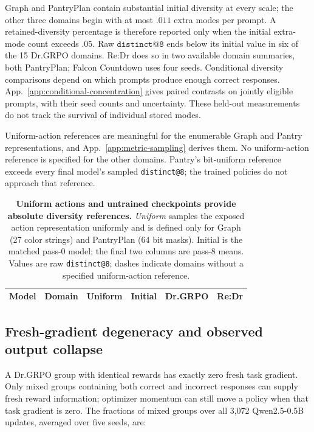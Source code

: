 \documentclass{article}
\makeatletter
\newcommand{\1}{\mathbf 1}
\newcommand{\distk}{\texttt{distinct@8}}
\theoremstyle{remark}
\theoremstyle{definition}
\theoremstyle{plain}
\makeatother
\begin{document}
Graph and PantryPlan contain substantial initial diversity at every scale;
the other three domains begin with at most $.011$ extra modes per prompt.
A retained-diversity percentage is therefore reported only when the initial
extra-mode count exceeds $.05$. Raw $\texttt{distinct@8}$ ends below its
initial value in six of the 15 Dr.GRPO domains. Re:Dr does so in
two available domain summaries, both PantryPlan; Falcon Countdown uses
four seeds. Conditional diversity comparisons depend on which prompts produce
enough correct responses. App.~\ref{app:conditional-concentration} gives
paired contrasts on jointly eligible prompts, with their seed counts and
uncertainty. These held-out measurements do not track the survival of
individual stored modes.

Uniform-action references are meaningful for the enumerable Graph and
Pantry representations, and App.~\ref{app:metric-sampling} derives them. No uniform-action
reference is specified for the other domains. Pantry's bit-uniform reference exceeds every final model's sampled
\texttt{distinct@8}; the trained policies do not approach that reference.

\begin{table}[t]
  \centering
  \caption{\textbf{Uniform actions and untrained checkpoints provide absolute diversity references.}
  \emph{Uniform} samples the exposed action representation uniformly and is
  defined only for Graph (27 color strings) and PantryPlan (64 bit masks).
  Initial is the matched pass-0 model; the final two columns are pass-8 means.
  Values are raw \distk{}; dashes indicate domains without a specified
  uniform-action reference.}
  \label{tab:absolute-support-references}
  \scriptsize
  \setlength{\tabcolsep}{4.2pt}
  \begin{tabular}{@{}llrrrr@{}}
    \toprule
    \textbf{Model} & \textbf{Domain} & \textbf{Uniform} & \textbf{Initial}
      & \textbf{Dr.GRPO} & \textbf{Re:Dr} \\
    \midrule
    
  \end{tabular}
\end{table}


\subsection{Fresh-gradient degeneracy and observed output collapse}
\label{app:degenerate-groups}

A Dr.GRPO group with identical rewards has exactly zero fresh task gradient.
Only mixed groups containing both correct and incorrect responses can
supply fresh reward information; optimizer momentum can still move a
policy when that task gradient is zero. The fractions of mixed groups
over all 3,072 Qwen2.5-0.5B updates, averaged over five seeds, are:
\end{document}
